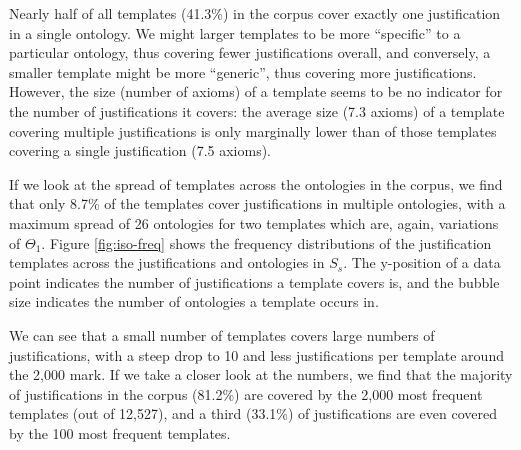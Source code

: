 Nearly half of all templates (41.3\%) in the corpus cover exactly one justification in a single ontology. We might larger templates to be more \enquote{specific} to a particular ontology, thus covering fewer justifications overall, and conversely, a smaller template might be more \enquote{generic}, thus covering more justifications. However, the size (number of axioms) of a template seems to be no indicator for the number of justifications it covers: the average size (7.3 axioms) of a template covering multiple justifications is only marginally lower than of those templates covering a single justification (7.5 axioms). 

If we look at the spread of templates across the ontologies in the corpus, we find that only 8.7\% of the templates cover justifications in multiple ontologies, with a maximum spread of 26 ontologies for two templates which are, again, variations of $\Theta_{1}$. Figure \ref{fig:iso-freq} shows the frequency distributions of the justification templates across the justifications and ontologies in $S_{s}$. The y-position of a data point indicates the number of justifications a template covers is, and the bubble size indicates the number of ontologies a template occurs in. 

We can see that a small number of templates covers large numbers of justifications, with a steep drop to 10 and less justifications per template around the 2,000 mark. If we take a closer look at the numbers, we find that the majority of justifications in the corpus (81.2\%) are covered by the 2,000 most frequent templates (out of 12,527), and a third (33.1\%) of justifications are even covered by the 100 most frequent templates.

